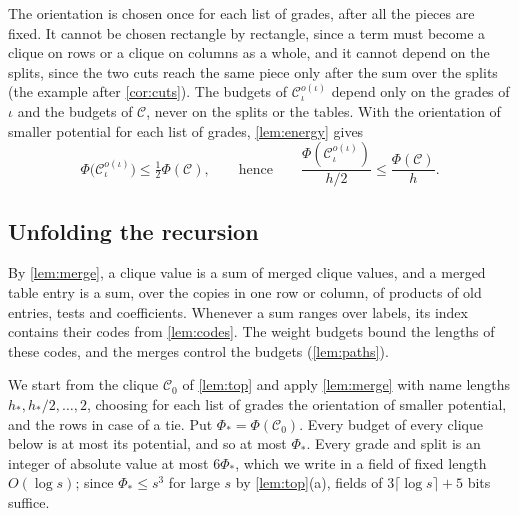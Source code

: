 \documentclass[11pt]{article}
\theoremstyle{definition}
\theoremstyle{definition}
\theoremstyle{remark}
\begin{document}
The orientation is chosen once for each list of grades, after all the pieces are fixed. It cannot be chosen rectangle by rectangle, since a term must become a clique on rows or a clique on columns as a whole, and it cannot depend on the splits, since the two cuts reach the same piece only after the sum over the splits (the example after \cref{cor:cuts}). The budgets of $\mathcal C^{o(\iota)}_\iota$ depend only on the grades of $\iota$ and the budgets of $\mathcal C$, never on the splits or the tables. With the orientation of smaller potential for each list of grades, \cref{lem:energy} gives
\[
\Phi\bigl(\mathcal C^{o(\iota)}_\iota\bigr)\le\tfrac12\Phi(\mathcal C),\qquad\text{hence}\qquad\frac{\Phi(\mathcal C^{o(\iota)}_\iota)}{h/2}\le\frac{\Phi(\mathcal C)}h.
\]

\subsection{Unfolding the recursion}\label{sec:formula}

By \cref{lem:merge}, a clique value is a sum of merged clique values, and a merged table entry is a sum, over the copies in one row or column, of products of old entries, tests and coefficients. Whenever a sum ranges over labels, its index contains their codes from \cref{lem:codes}. The weight budgets bound the lengths of these codes, and the merges control the budgets (\cref{lem:paths}).

We start from the clique $\mathcal C_0$ of \cref{lem:top} and apply \cref{lem:merge} with name lengths $h_*,h_*/2,\dots,2$, choosing for each list of grades the orientation of smaller potential, and the rows in case of a tie. Put $\Phi_*=\Phi(\mathcal C_0)$. Every budget of every clique below is at most its potential, and so at most $\Phi_*$. Every grade and split is an integer of absolute value at most $6\Phi_*$, which we write in a field of fixed length $O(\log s)$; since $\Phi_*\le s^3$ for large $s$ by \cref{lem:top}(a), fields of $3\lceil\log s\rceil+5$ bits suffice.
\end{document}
